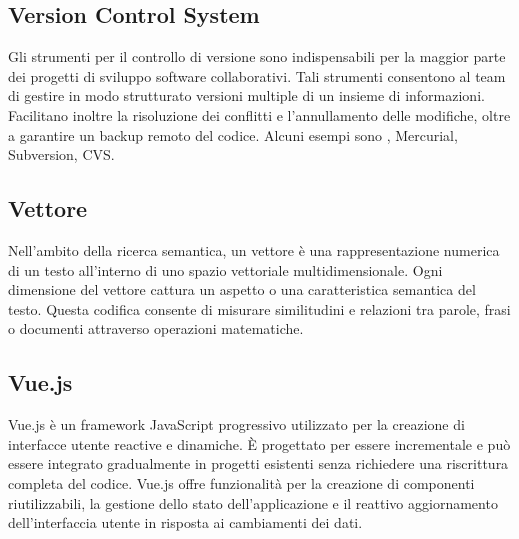 \vspace{2em}
\subsection*{Version Control System}
\par Gli strumenti per il controllo di versione sono indispensabili per la maggior parte dei progetti di sviluppo software collaborativi. Tali strumenti consentono al team di gestire in modo strutturato versioni multiple di un insieme di informazioni. Facilitano inoltre la risoluzione dei conflitti e l'annullamento delle modifiche, oltre a garantire un backup remoto del codice.
Alcuni esempi sono , Mercurial, Subversion, CVS.

\vspace{2em}
\subsection*{Vettore}
\par Nell’ambito della ricerca semantica, un vettore è una rappresentazione numerica di un testo all’interno di uno spazio vettoriale multidimensionale. Ogni dimensione del vettore cattura un aspetto o una caratteristica semantica del testo. Questa codifica consente di misurare similitudini e relazioni tra parole, frasi o documenti attraverso operazioni matematiche.

\vspace{2em}
\subsection*{Vue.js}
\par Vue.js è un framework JavaScript progressivo utilizzato per la creazione di interfacce utente reactive e dinamiche. È progettato per essere incrementale e può essere integrato gradualmente in progetti esistenti senza richiedere una riscrittura completa del codice. Vue.js offre funzionalità per la creazione di componenti riutilizzabili, la gestione dello stato dell'applicazione e il reattivo aggiornamento dell'interfaccia utente in risposta ai cambiamenti dei dati.
